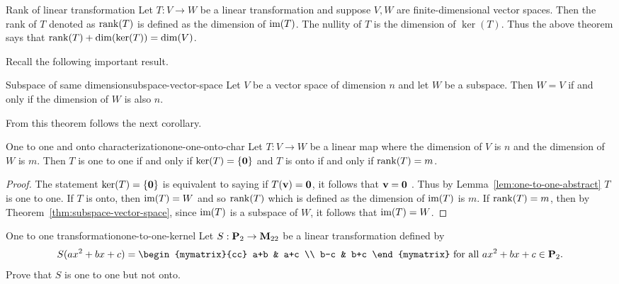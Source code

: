 \begin{definition}{Rank of linear transformation}{}
Let $T:V\rightarrow W$ be a linear transformation and suppose $V,W$ are finite-dimensional vector spaces. Then
the rank of $T$ denoted as $\rank(T) $ is defined as the
dimension of $\mbox{\rm im}(T)$. The nullity of $T$ is the
dimension of $\ker (T)$. Thus the above theorem says that $
\rank(T) +\dim (\ker (T)) =\dim
(V)$.
\end{definition}

Recall the following important result.

\begin{theorem}{Subspace of same dimension}{subspace-vector-space}
Let $V$ be a vector space of dimension $n$ and let $W$ be a
subspace. Then $W=V$ if and only if the dimension of $W$ is also $n$.
\end{theorem}

From this theorem follows the next corollary.

\begin{corollary}{One to one and onto characterization}{one-one-onto-char}
Let $T:V\rightarrow W$ be a linear map where the dimension of $V$ is $n$ and
the dimension of $W$ is $m$. Then $T$ is one to one if and only if $\ker
(T) =\left\{\mbox{\bf 0}\right\} $ and $T$ is onto if and only if $
\rank(T) =m$.
\end{corollary}

\begin{proof}
The statement $\ker (T) =\left\{\mbox{\bf 0}\right\} $
is equivalent to saying if $T (\mbox{\bf v})=\mbox{\bf 0}$, it follows that $\mbox{\bf v}=\mbox{\bf 0}$
. Thus by Lemma~\ref{lem:one-to-one-abstract} $T$ is one to one. If $T$ is onto, then $
\mbox{\rm im}(T) =W$ and so $\rank(T) $ which is
defined as the dimension of $\mbox{\rm im}(T) $ is $m$. If $\rank(T) =m$, then by Theorem~\ref{thm:subspace-vector-space}, since $\mbox{\rm im}
(T) $ is a subspace of $W$, it follows that $\mbox{\rm im}(
T) =W$.
\end{proof}

\begin{example}{One to one transformation}{one-to-one-kernel}
Let $S:\mathbf{P}_2\to\mathbf{M}_{22}$ be a linear transformation
defined by
\[ S(ax^2+bx+c)
=
\begin{mymatrix}{cc}
a+b & a+c \\ b-c & b+c \end{mymatrix}
\mbox{ for all }
 ax^2+bx+c\in \Poly_2.\]
Prove that $S$ is one to one but not onto.
\end{example}


